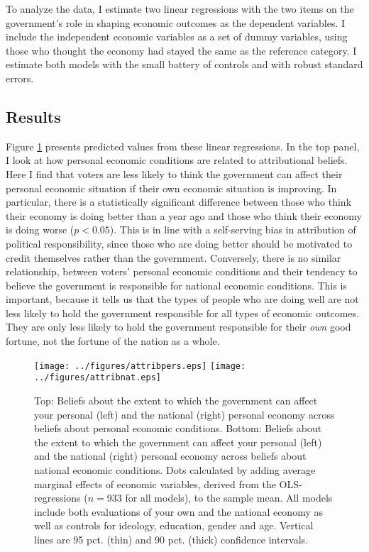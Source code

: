 \documentclass[a4paper,11pt]{article}
\begin{document}
	To analyze the data, I estimate two linear regressions with the two items on the government's role in shaping economic outcomes as the dependent variables. I include the independent economic variables as a set of dummy variables, using those who thought the economy had stayed the same as the reference category. I estimate both models with the small battery of controls and with robust standard errors.
	
	\subsection*{Results}
	
	Figure	\ref{attribution} presents predicted values from these linear regressions. In the top panel, I look at how personal economic conditions are related to attributional beliefs. Here I find that voters are less likely to think the government can affect their personal economic situation if their own economic situation is improving. In particular, there is a statistically significant difference between those who think their economy is doing better than a year ago and those who think their economy is doing worse ($p<0.05$). This is in line with a self-serving bias in attribution of political responsibility, since those who are doing better should be motivated to credit themselves rather than the government. Conversely, there is no similar relationship, between voters' personal economic conditions and their tendency to believe the government is responsible for national economic conditions. This is important, because it tells us that the types of people who are doing well are not less likely to hold the government responsible for all types of economic outcomes. They are only less likely to hold the government responsible for their \textit{own} good fortune, not the fortune of the nation as a whole.
	
	\begin{figure}[htbp]
		\texttt{[image: ../figures/attribpers.eps]} \centering
		\texttt{[image: ../figures/attribnat.eps]} \centering
		\caption{Top: Beliefs about the extent to which the government can affect your personal (left) and the national (right) personal economy across beliefs about personal economic conditions. Bottom: Beliefs about the extent to which the government can affect your personal (left) and the national (right) personal economy across beliefs about national economic conditions. Dots calculated by adding average marginal effects of economic variables, derived from the OLS-regressions ($n=933$ for all models), to the sample mean. All models include both evaluations of your own and the national economy as well as controls for ideology, education, gender and age.  Vertical lines are 95 pct. (thin) and 90 pct. (thick) confidence intervals.} 
		\label{attribution}
	\end{figure}
	
\end{document}
